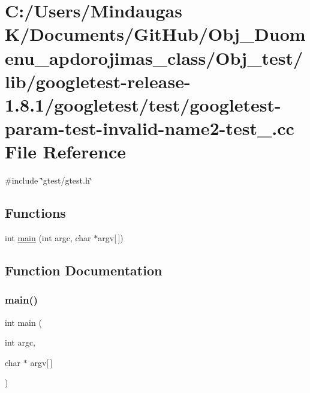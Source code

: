 \hypertarget{_obj__test_2lib_2googletest-release-1_88_81_2googletest_2test_2googletest-param-test-invalid-name2-test___8cc}{}\section{C\+:/\+Users/\+Mindaugas K/\+Documents/\+Git\+Hub/\+Obj\+\_\+\+Duomenu\+\_\+apdorojimas\+\_\+class/\+Obj\+\_\+test/lib/googletest-\/release-\/1.8.1/googletest/test/googletest-\/param-\/test-\/invalid-\/name2-\/test\+\_\+.cc File Reference}
\label{_obj__test_2lib_2googletest-release-1_88_81_2googletest_2test_2googletest-param-test-invalid-name2-test___8cc}
{\ttfamily \#include \char`\"{}gtest/gtest.\+h\char`\"{}}\newline
\subsection*{Functions}
\begin{DoxyCompactItemize}
\item 
int \mbox{\hyperlink{_obj__test_2lib_2googletest-release-1_88_81_2googletest_2test_2googletest-param-test-invalid-name2-test___8cc_a0ddf1224851353fc92bfbff6f499fa97}{main}} (int argc, char $\ast$argv\mbox{[}$\,$\mbox{]})
\end{DoxyCompactItemize}


\subsection{Function Documentation}
\mbox{\label{_obj__test_2lib_2googletest-release-1_88_81_2googletest_2test_2googletest-param-test-invalid-name2-test___8cc_a0ddf1224851353fc92bfbff6f499fa97}} 
\subsubsection{\texorpdfstring{main()}{main()}}
{\footnotesize\ttfamily int main (\begin{DoxyParamCaption}\item[{int}]{argc,  }\item[{char $\ast$}]{argv\mbox{[}$\,$\mbox{]} }\end{DoxyParamCaption})}

